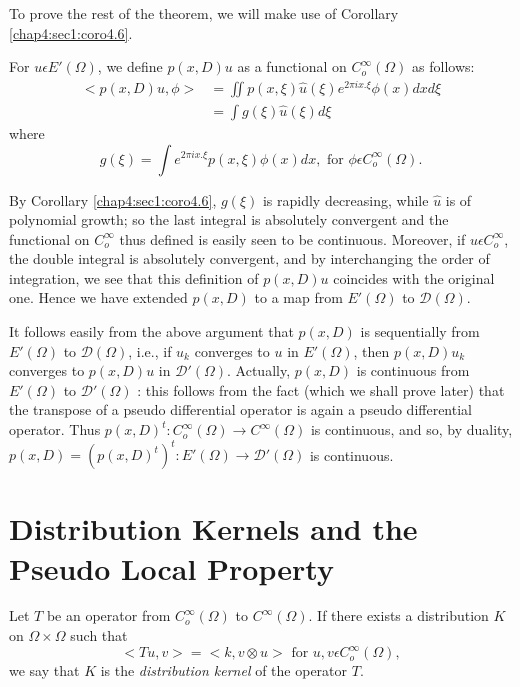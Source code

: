 To prove the rest of the theorem, we will make use of
Corollary \ref{chap4:sec1:coro4.6}.

For $u \epsilon E'(\Omega)$, we define $p(x,D)u$ as a functional on
$C^\infty_o(\Omega)$ as follows: 
\begin{align*}
  < p(x,D)u, \phi > & = \iint p(x,\xi) \hat{u}(\xi) e^{2 \pi ix.\xi}
  \phi(x)dx d \xi \\ 
  & = \int g(\xi)\hat{u}(\xi) d\xi
\end{align*}
where\pageoriginale
$$
g(\xi)=\int e^{2 \pi ix.\xi} p(x,\xi)\phi(x)dx, \text{ for }  \phi
\epsilon C^\infty_o(\Omega). 
$$

By Corollary \ref{chap4:sec1:coro4.6}, $g(\xi)$ is rapidly decreasing, while $\hat{u}$ is
of polynomial growth; so the last integral is absolutely convergent
and the functional on $C^\infty_o$ thus defined is easily seen to be
continuous. Moreover,  if $u \epsilon C^\infty_o$, the double
integral is absolutely convergent, and by interchanging the order of
integration, we see that this definition of $p(x,D)u$ coincides with
the original one. Hence we have extended $p(x,D)$ to a map from
$E'(\Omega)$ to $\mathcal{D}(\Omega)$. 

\setcounter{rem}{7}
\begin{rem} \label{chap4:sec1:rem4.8}
  It follows easily from the above argument that $p(x,D)$ is
  sequentially from $E'(\Omega)$ to $\mathcal{D}(\Omega)$, i.e., if
  $u_k$ converges to $u$ in $E'(\Omega)$, then $p(x,D)u_k$ converges to
  $p(x,D)u$ in $\mathcal{D}'(\Omega)$. Actually, $p(x,D)$ is continuous
  from $E'(\Omega)$ to $\mathcal{D}'(\Omega)$ : this follows from the
  fact (which we shall prove later) that the transpose of a pseudo
  differential operator is again a pseudo differential operator. Thus
  $p(x,D)^t : C^\infty_o(\Omega) \to C^\infty(\Omega)$ is continuous,
  and so, by duality, $p(x,D)=(p(x,D)^t)^t : E'(\Omega) \to
  \mathcal{D}'(\Omega)$ is continuous. 
\end{rem}

\section{Distribution Kernels and the Pseudo Local Property}\label{chap4:sec2}

\setcounter{defi}{8}
\begin{defi} \label{chap4:sec2:def4.9}
  Let $T$ be an operator from $C^\infty_o(\Omega)$ to
  $C^\infty(\Omega)$. If there exists a distribution $K$ on $\Omega
  \times \Omega$ such that  
  $$
  < Tu, v > = < k, v \otimes u > \text{ for } u,v \epsilon C^\infty_o
  (\Omega),  
  $$
  we say that $K$ is the {\em distribution kernel} of the operator $T$.
\end{defi}

